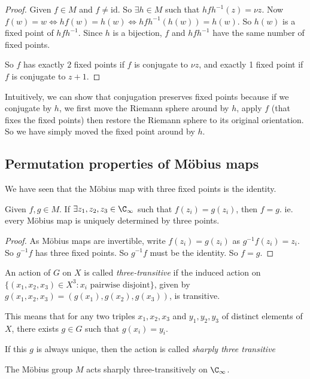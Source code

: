 \documentclass[a4paper]{article}
\begin{document}
\begin{proof}
  Given $f\in M$ and $f\not= \mathrm{id}$. So $\exists h\in M$ such that $hfh^{-1}(z) = \nu{z}$. Now $f(w) = w \Leftrightarrow hf(w) = h(w) \Leftrightarrow hfh^{-1}(h(w)) = h(w)$. So $h(w)$ is a fixed point of $hfh^{-1}$. Since $h$ is a bijection, $f$ and $hfh^{-1}$ have the same number of fixed points.

  So $f$ has exactly $2$ fixed points if $f$ is conjugate to $\nu z$, and exactly 1 fixed point if $f$ is conjugate to $z + 1$.
\end{proof}
Intuitively, we can show that conjugation preserves fixed points because if we conjugate by $h$, we first move the Riemann sphere around by $h$, apply $f$ (that fixes the fixed points) then restore the Riemann sphere to its original orientation. So we have simply moved the fixed point around by $h$.

\subsection{Permutation properties of M\"obius maps}
We have seen that the M\"obius map with three fixed points is the identity.

\begin{prop}
  Given $f, g\in M$. If $\exists z_1, z_2, z_3\in \C_{\infty}$ such that $f(z_i) = g(z_i)$, then $f = g$. ie. every M\"obius map is uniquely determined by three points.
\end{prop}

\begin{proof}
  As M\"obius maps are invertible, write $f(z_i) = g(z_i)$ as $g^{-1}f(z_i) = z_i$. So $g^{-1}f$ has three fixed points. So $g^{-1}f$ must be the identity. So $f = g$.
\end{proof}

\begin{defi}
  An action of $G$ on $X$ is called \emph{three-transitive} if the induced action on $\{(x_1, x_2, x_3)\in X^3: x_i\text{ pairwise disjoint}\}$, given by $g(x_1, x_2, x_3) = (g(x_1), g(x_2), g(x_3))$, is transitive.

  This means that for any two triples $x_1, x_2, x_3$ and $y_1, y_2, y_3$ of distinct elements of $X$, there exists $g\in G$ such that $g(x_i) = y_i$.

  If this $g$ is always unique, then the action is called \emph{sharply three transitive}
\end{defi}

\begin{prop}
  The M\"obius group $M$ acts sharply three-transitively on $\C_\infty$.
\end{prop}
\end{document}
